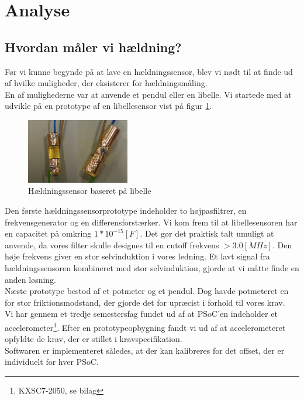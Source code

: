\section{Analyse}
\label{ch:analyse}
\subsection{Hvordan måler vi hældning?}
Før vi kunne begynde på at lave en hældningssensor, blev vi nødt til at finde ud af hvilke muligheder, der eksisterer for hældningsmåling. \\
En af mulighederne var at anvende et pendul eller en libelle. Vi startede med at udvikle på en prototype af en libellesensor vist på figur \ref{fig:libelle}.
\begin{figure}[hbpt]
\centering
\includegraphics[width=0.4\textwidth]{billeder/libellesensor1}
\caption{Hældningssensor baseret på libelle}
\label{fig:libelle}
\end{figure}
Den første hældningssensorprototype indeholder to højpasfiltrer, en frekvensgenerator og en differensforstærker. Vi kom frem til at libellesensoren har en capacitet på omkring $1*10^{-15}[F]$. Det gør det praktisk talt umuligt at anvende, da vores filter skulle designes til en cutoff frekvens $>3.0[MHz]$. Den høje frekvens giver en stor selvinduktion i vores ledning. Et lavt signal fra hældningssensoren kombineret med stor selvinduktion, gjorde at vi måtte finde en anden løsning.\\
Næste prototype bestod af et potmeter og et pendul. Dog havde potmeteret en for stor friktionsmodstand, der gjorde det for upræcist i forhold til vores krav.\\
Vi har gennem et tredje semestersfag fundet ud af at PSoC'en indeholder et accelerometer\footnote{KXSC7-2050, se bilag}. Efter en prototypeopbygning fandt vi ud af at accelerometeret opfyldte de krav, der er stillet i kravspecifikation. \\
Softwaren er implementeret således, at der kan kalibreres for det offset, der er individuelt for hver PSoC.
